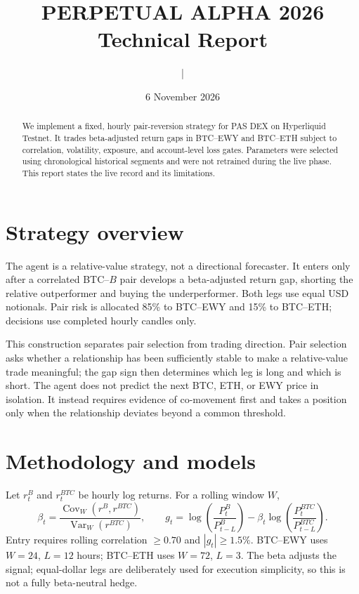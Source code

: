 \documentclass[a4paper,9pt]{article}
\title{\vspace{-1.1cm}\large PERPETUAL ALPHA 2026\\[1.5mm]Technical Report}
\author{\teamname{} \;|\; \texttt{\contactemail}}\date{6 November 2026}
\begin{document}
\maketitle\vspace{-0.6cm}
\begin{abstract}
We implement a fixed, hourly pair-reversion strategy for PAS DEX on Hyperliquid
Testnet. It trades beta-adjusted return gaps in BTC--EWY and BTC--ETH subject to
correlation, volatility, exposure, and account-level loss gates. Parameters
were selected using chronological historical segments and were not retrained
during the live phase. This report states the live record and its limitations.
\end{abstract}

\section{Strategy overview}
The agent is a relative-value strategy, not a directional forecaster. It enters
only after a correlated BTC--$B$ pair develops a beta-adjusted return gap,
shorting the relative outperformer and buying the underperformer. Both legs use
equal USD notionals. Pair risk is allocated 85\% to BTC--EWY and 15\% to
BTC--ETH; decisions use completed hourly candles only.

This construction separates pair selection from trading direction. Pair
selection asks whether a relationship has been sufficiently stable to make a
relative-value trade meaningful; the gap sign then determines which leg is long
and which is short. The agent does not predict the next BTC, ETH, or EWY price
in isolation. It instead requires evidence of co-movement first and takes a
position only when the relationship deviates beyond a common threshold.

\section{Methodology and models}
Let $r_t^B$ and $r_t^{BTC}$ be hourly log returns. For a rolling window $W$,
\[
\beta_t=\frac{\operatorname{Cov}_W(r^B,r^{BTC})}{\operatorname{Var}_W(r^{BTC})},\qquad
g_t=\log\left(\frac{P_t^B}{P_{t-L}^B}\right)-\beta_t\log\left(\frac{P_t^{BTC}}{P_{t-L}^{BTC}}\right).
\]
Entry requires rolling correlation $\geq0.70$ and $|g_t|\geq1.5\%$.
BTC--EWY uses $W=24$, $L=12$ hours; BTC--ETH uses $W=72$, $L=3$.
The beta adjusts the signal; equal-dollar legs are deliberately used for
execution simplicity, so this is not a fully beta-neutral hedge.
\end{document}
